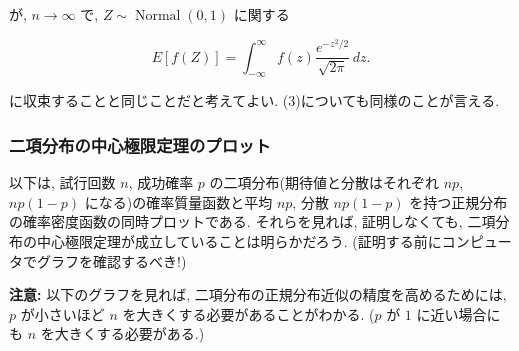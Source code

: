 \documentclass[
  letterpaper,
  DIV=11,
  numbers=noendperiod]{scrartcl}
\newenvironment{Shaded}{\begin{snugshade}}{\end{snugshade}}
\newcommand{\CommentTok}[1]{\textcolor[rgb]{0.37,0.37,0.37}{#1}}
\newcommand{\FloatTok}[1]{\textcolor[rgb]{0.68,0.00,0.00}{#1}}
\newcommand{\FunctionTok}[1]{\textcolor[rgb]{0.28,0.35,0.67}{#1}}
\newcommand{\KeywordTok}[1]{\textcolor[rgb]{0.00,0.23,0.31}{#1}}
\newcommand{\NormalTok}[1]{\textcolor[rgb]{0.00,0.23,0.31}{#1}}
\newcommand{\OperatorTok}[1]{\textcolor[rgb]{0.37,0.37,0.37}{#1}}
\newcommand{\SpecialCharTok}[1]{\textcolor[rgb]{0.37,0.37,0.37}{#1}}
\newcommand{\StringTok}[1]{\textcolor[rgb]{0.13,0.47,0.30}{#1}}
\begin{document}
が, \(n\to\infty\) で, \(Z\sim\operatorname{Normal}(0,1)\) に関する

\[
E[f(Z)] = \int_{-\infty}^\infty f(z)\frac{e^{-z^2/2}}{\sqrt{2\pi}}\,dz.
\]

に収束することと同じことだと考えてよい. (3)についても同様のことが言える.

\hypertarget{ux4e8cux9805ux5206ux5e03ux306eux4e2dux5fc3ux6975ux9650ux5b9aux7406ux306eux30d7ux30edux30c3ux30c8}{%
\subsubsection{二項分布の中心極限定理のプロット}\label{ux4e8cux9805ux5206ux5e03ux306eux4e2dux5fc3ux6975ux9650ux5b9aux7406ux306eux30d7ux30edux30c3ux30c8}}

以下は, 試行回数 \(n\), 成功確率 \(p\) の二項分布(期待値と分散はそれぞれ
\(np\), \(np(1-p)\) になる)の確率質量函数と平均 \(np\), 分散 \(np(1-p)\)
を持つ正規分布の確率密度函数の同時プロットである. それらを見れば,
証明しなくても, 二項分布の中心極限定理が成立していることは明らかだろう.
(証明する前にコンピュータでグラフを確認するべき!)

\textbf{注意:} 以下のグラフを見れば,
二項分布の正規分布近似の精度を高めるためには, \(p\) が小さいほど \(n\)
を大きくする必要があることがわかる. (\(p\) が \(1\) に近い場合にも \(n\)
を大きくする必要がある.)

\begin{Shaded}
\end{Shaded}
\end{document}
